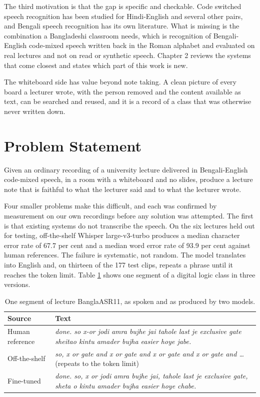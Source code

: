 The third motivation is that the gap is specific and checkable. Code switched speech
recognition has been studied for Hindi-English and several other pairs, and Bengali
speech recognition has its own literature. What is missing is the combination a
Bangladeshi classroom needs, which is recognition of Bengali-English code-mixed speech
written back in the Roman alphabet and evaluated on real lectures and not on read or
synthetic speech. Chapter 2 reviews the systems that come closest and states which part
of this work is new.

The whiteboard side has value beyond note taking. A clean picture of every board a
lecturer wrote, with the person removed and the content available as text, can be
searched and reused, and it is a record of a class that was otherwise never written down.

\section{Problem Statement}

Given an ordinary recording of a university lecture delivered in Bengali-English
code-mixed speech, in a room with a whiteboard and no slides, produce a lecture note that
is faithful to what the lecturer said and to what the lecturer wrote.

Four smaller problems make this difficult, and each was confirmed by measurement on our
own recordings before any solution was attempted. The first is that existing systems do
not transcribe the speech. On the six lectures held out for testing,
off-the-shelf Whisper large-v3-turbo produces a median character error rate of 67.7 per
cent and a median word error rate of 93.9 per cent against human references. The failure
is systematic, not random. The model translates into English and, on thirteen of
the 177 test clips, repeats a phrase until it reaches the token limit. Table
\ref{tab:motivating_example} shows one segment of a digital logic class in three
versions.

\begin{table}[htbp]
\centering
\caption{One segment of lecture BanglaASR11, as spoken and as produced by two models.}
\label{tab:motivating_example}
\begin{tabular}{p{2.6cm}p{10.5cm}}
\toprule
Source & Text \\
\midrule
Human reference &
\textit{done. so x-or jodi amra bujhe jai tahole last je exclusive gate sheitao kintu
amader bujha easier hoye jabe.} \\
\addlinespace
Off-the-shelf &
\textit{so, x or gate and x or gate and x or gate and x or gate and \dots} (repeats to
the token limit) \\
\addlinespace
Fine-tuned &
\textit{done. so, x or jodi amra bujhe jai, tahole last je exclusive gate, sheta o kintu
amader bujha easier hoye chabe.} \\
\bottomrule
\end{tabular}
\end{table}

